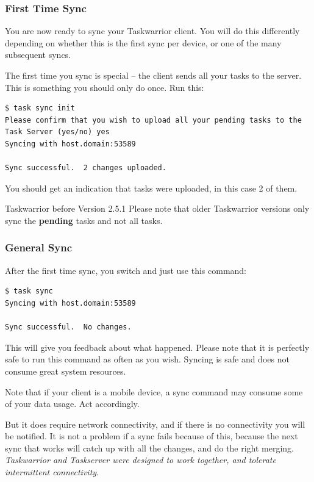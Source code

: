 \documentclass[t,handout]{beamer}
\begin{document}
\begin{frame}[fragile]\frametitle{First Time Sync}

    You are now ready to sync your Taskwarrior client. You will do this differently depending on whether this is the first sync per device, or one of the many subsequent syncs.

    The first time you sync is special -- the client sends all your tasks to the server.  This is something you should only do once.  Run this:

    \begin{lstlisting}
$ task sync init
Please confirm that you wish to upload all your pending tasks to the Task Server (yes/no) yes
Syncing with host.domain:53589

Sync successful.  2 changes uploaded.\end{lstlisting}

    You should get an indication that tasks were uploaded, in this case 2 of them.

    \begin{alertblock}{Taskwarrior before Version 2.5.1}
        Please note that older Taskwarrior versions only sync the \textbf{pending} tasks and not all tasks.
    \end{alertblock}
\end{frame}

\begin{frame}[fragile]\frametitle{General Sync}
    After the first time sync, you switch and just use this command:

    \begin{lstlisting}
$ task sync
Syncing with host.domain:53589

Sync successful.  No changes.\end{lstlisting}

    This will give you feedback about what happened. Please note that it is perfectly safe to run this command as often as you wish. Syncing is safe and does not consume great system resources.

    Note that if your client is a mobile device, a sync command may consume some of your data usage. Act accordingly.

    But it does require network connectivity, and if there is no connectivity you will be notified.  It is not a problem if a sync fails because of this, because the next sync that works will catch up with all the changes, and do the right merging. \emph{Taskwarrior and Taskserver were designed to work together, and tolerate intermittent connectivity}.
\end{frame}
\end{document}
